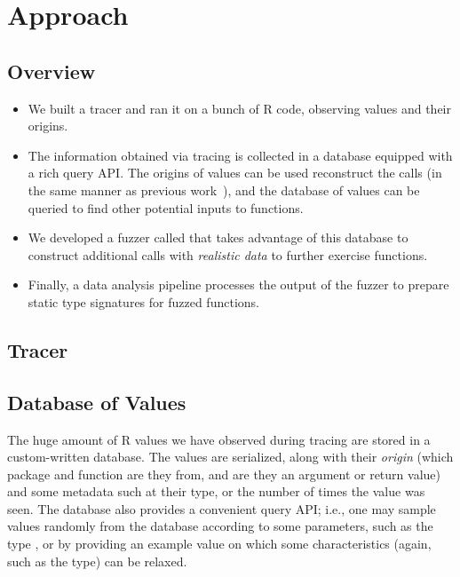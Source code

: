 \section{Approach}


\subsection{Overview}


\begin{itemize}
    \item We built a tracer and ran it on a bunch of R code, observing values and their origins. 
    \item The information obtained via tracing is collected in a database equipped with a rich query API. 
    The origins of values can be used reconstruct the calls (in the same manner as previous work~\cite{turcotte2020designing}), and the database of values can be queried to find other potential inputs to functions.
    \item We developed a fuzzer called \tool that takes advantage of this database to construct additional calls with \textit{realistic data} to further exercise functions.
    \item Finally, a data analysis pipeline processes the output of the fuzzer to prepare static type signatures for fuzzed functions.
\end{itemize}

\subsection{Tracer}


\subsection{Database of Values}

The huge amount of R values we have observed during tracing are stored in a custom-written database. 
The values are serialized, along with their \textit{origin} (which package and function are they from, and are they an argument or return value) and some metadata such at their type, or the number of times the value was seen. 
The database also provides a convenient query API; i.e., one may sample values randomly from the database according to some parameters, such as the type , or by providing an example value on which some characteristics (again, such as the type) can be relaxed.

